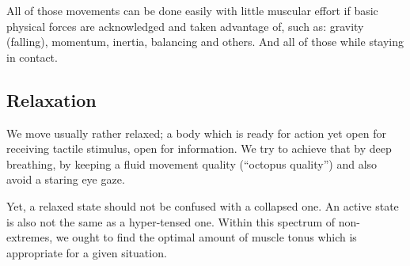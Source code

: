 All of those movements can be done easily with little muscular effort if basic physical forces are acknowledged and taken advantage of, such as: gravity (falling), momentum, inertia, balancing and others.
And all of those while staying in contact.

\subsection{Relaxation}\label{subsec:relaxation}

We move usually rather relaxed; a body which is ready for action yet open for receiving tactile stimulus, open for information.
We try to achieve that by deep breathing, by keeping a fluid movement quality (``octopus quality'') and also avoid a staring eye gaze.

Yet, a relaxed state should not be confused with a collapsed one.
An active state is also not the same as a hyper-tensed one.
Within this spectrum of non-extremes, we ought to find the optimal amount of muscle tonus which is appropriate for a given situation.
